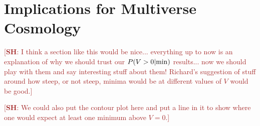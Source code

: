 \documentclass[12pt]{article}
\newcommand{\SH}[1]{\textcolor{brown}{[{\bf SH}: #1]}}
\begin{document}



\section{Implications for Multiverse Cosmology}

\SH{I think a section like this would be nice... everything up to now is an explanation of why we should trust our $P(V>0|{\rm min})$ results... now we should play with them and say interesting stuff about them! Richard's suggestion of stuff around how steep, or not steep, minima would be at different values of $V$ would be good.}

\SH{We could also put the contour plot here and put a line in it to show where one would expect at least one minimum above $V=0$.}
  
\end{document}
